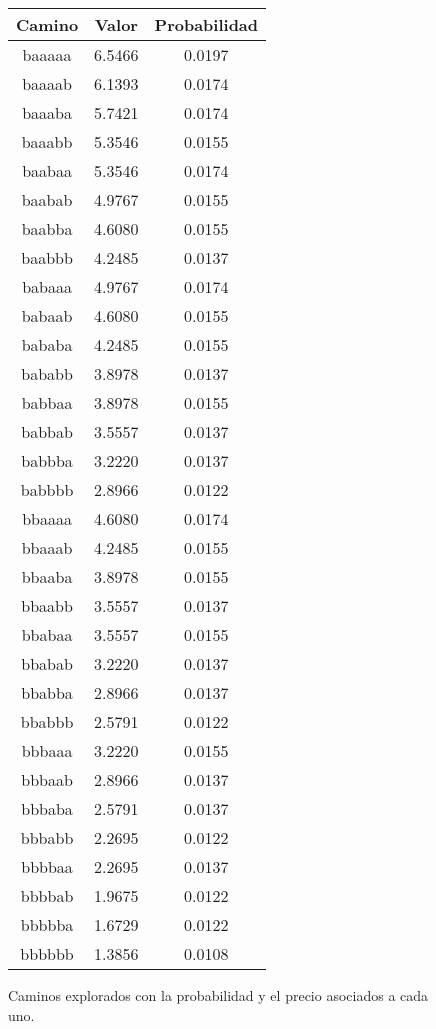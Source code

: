 \begin{figure}[hbpt]
\begin{minipage}{0.48\textwidth}
\begin{center}
\begin{tabular}{|c|c|c|}
\hline
\end{tabular}
\end{center}
\end{minipage}
\begin{minipage}{0.48\textwidth}
\begin{center}
\begin{tabular}{|c|c|c|}
\hline
\textbf{Camino} & \textbf{Valor} & \textbf{Probabilidad} \\
\hline
baaaaa  &  6.5466  &  0.0197  \\
baaaab  &  6.1393  &  0.0174  \\
baaaba  &  5.7421  &  0.0174  \\
baaabb  &  5.3546  &  0.0155  \\
baabaa  &  5.3546  &  0.0174  \\
baabab  &  4.9767  &  0.0155  \\
baabba  &  4.6080  &  0.0155  \\
baabbb  &  4.2485  &  0.0137  \\
babaaa  &  4.9767  &  0.0174  \\
babaab  &  4.6080  &  0.0155  \\
bababa  &  4.2485  &  0.0155  \\
bababb  &  3.8978  &  0.0137  \\
babbaa  &  3.8978  &  0.0155  \\
babbab  &  3.5557  &  0.0137  \\
babbba  &  3.2220  &  0.0137  \\
babbbb  &  2.8966  &  0.0122  \\
bbaaaa  &  4.6080  &  0.0174  \\
bbaaab  &  4.2485  &  0.0155  \\
bbaaba  &  3.8978  &  0.0155  \\
bbaabb  &  3.5557  &  0.0137  \\
bbabaa  &  3.5557  &  0.0155  \\
bbabab  &  3.2220  &  0.0137  \\
bbabba  &  2.8966  &  0.0137  \\
bbabbb  &  2.5791  &  0.0122  \\
bbbaaa  &  3.2220  &  0.0155  \\
bbbaab  &  2.8966  &  0.0137  \\
bbbaba  &  2.5791  &  0.0137  \\
bbbabb  &  2.2695  &  0.0122  \\
bbbbaa  &  2.2695  &  0.0137  \\
bbbbab  &  1.9675  &  0.0122  \\
bbbbba  &  1.6729  &  0.0122  \\
bbbbbb  &  1.3856  &  0.0108  \\
\hline
\end{tabular}
\end{center}
\end{minipage}
\caption{Caminos explorados con la probabilidad y el precio asociados a cada uno.}
\label{fig:2_3b}
\end{figure}

